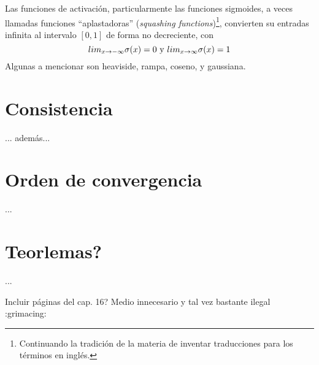\documentclass[12pt]{extarticle}
\newenvironment{comentarios_meta}
    {\begin{framed}\noindent\textcolor{red}{\textbf{//}}}
    {\end{framed}}
\begin{document}
    Las funciones de activación, particularmente las funciones sigmoides, a veces llamadas funciones ``aplastadoras'' (\textit{squashing functions})\footnote{Continuando la tradición de la materia de inventar traducciones para los términos en inglés.}, convierten su entradas infinita al intervalo $[0,1]$ de forma no decreciente, con
    \begin{equation*}
        lim_{x \to -\infty} \sigma(x) = 0 \textnormal{ y } lim_{x \to \infty} \sigma(x) = 1
    \end{equation*}
    Algunas a mencionar son heaviside, rampa, coseno, y gaussiana.
    

\section{Consistencia}

    ... además...


\section{Orden de convergencia}

    ...
    

\section{Teorlemas?}

    ...




% 
% 


\begin{comentarios_meta}
    Incluir páginas del cap. 16? Medio innecesario y tal vez bastante ilegal :grimacing:
\end{comentarios_meta}
\end{document}

